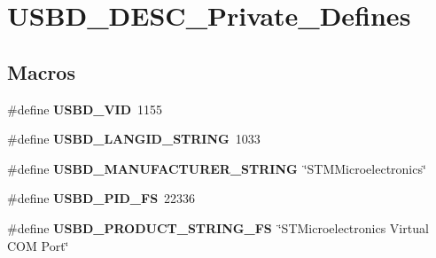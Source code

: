 \hypertarget{group___u_s_b_d___d_e_s_c___private___defines}{}\section{U\+S\+B\+D\+\_\+\+D\+E\+S\+C\+\_\+\+Private\+\_\+\+Defines}
\label{group___u_s_b_d___d_e_s_c___private___defines}
\subsection*{Macros}
\begin{DoxyCompactItemize}
\item 
\mbox{\label{group___u_s_b_d___d_e_s_c___private___defines_gac5251397ce2246b546b472cd802e6d62}} 
\#define {\bfseries U\+S\+B\+D\+\_\+\+V\+ID}~1155
\item 
\mbox{\label{group___u_s_b_d___d_e_s_c___private___defines_ga070dd542d4d914e86fdf103fa5fdd72f}} 
\#define {\bfseries U\+S\+B\+D\+\_\+\+L\+A\+N\+G\+I\+D\+\_\+\+S\+T\+R\+I\+NG}~1033
\item 
\mbox{\label{group___u_s_b_d___d_e_s_c___private___defines_gaee0c9fd7e8265b90126028919cd863a6}} 
\#define {\bfseries U\+S\+B\+D\+\_\+\+M\+A\+N\+U\+F\+A\+C\+T\+U\+R\+E\+R\+\_\+\+S\+T\+R\+I\+NG}~\char`\"{}S\+T\+M\+Microelectronics\char`\"{}
\item 
\mbox{\label{group___u_s_b_d___d_e_s_c___private___defines_gaa6f9e36da39c9881963cabf42df4d216}} 
\#define {\bfseries U\+S\+B\+D\+\_\+\+P\+I\+D\+\_\+\+FS}~22336
\item 
\mbox{\label{group___u_s_b_d___d_e_s_c___private___defines_gaa11017e20e3a2f1ef891b86212c4b730}} 
\#define {\bfseries U\+S\+B\+D\+\_\+\+P\+R\+O\+D\+U\+C\+T\+\_\+\+S\+T\+R\+I\+N\+G\+\_\+\+FS}~\char`\"{}S\+T\+Microelectronics Virtual C\+OM Port\char`\"{}
\item 
\mbox{\label{group___u_s_b_d___d_e_s_c___private___defines_ga0057246fa742e75846bb0467a84921fc}} 

\end{DoxyCompactItemize}
